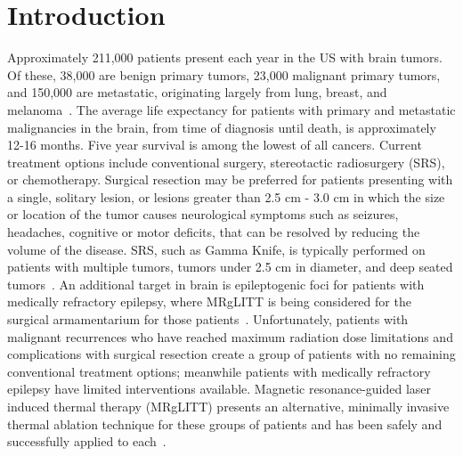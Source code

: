 \documentclass[12pt]{article}
\begin{document}
\section{Introduction}

Approximately 211,000 patients present each year in the US with brain
tumors.  Of these, 38,000 are benign primary tumors, 23,000 malignant
primary tumors, and 150,000 are metastatic, originating largely from lung,
breast, and melanoma~\cite{NCIFact13,
kalkanis2010evidence,gavrilovic2005brain,bafaloukos2004treatment,Owonikoko2014}.
The average life expectancy for patients with primary and metastatic
malignancies in the brain, from time of diagnosis until death, is
approximately 12-16 months. Five year survival is among the lowest of all
cancers. Current treatment options include conventional surgery,
stereotactic radiosurgery (SRS), or chemotherapy.  
Surgical resection may be preferred for patients presenting with a single,
solitary lesion, or lesions greater than 2.5 cm - 3.0 cm in which the size
or location of the tumor causes neurological symptoms such as seizures,
headaches, cognitive or motor deficits, that can be resolved by reducing
the volume of the disease.
SRS, such as Gamma Knife\textsuperscript{\textregistered}, is typically performed on patients with multiple
tumors, tumors under 2.5 cm in diameter, and deep seated tumors~\cite{alexander1995stereotactic}.
An additional target in brain is
epileptogenic foci for patients with medically refractory epilepsy,
where MRgLITT is being considered for the surgical armamentarium for those patients~\cite{Curry2012,Nowell2014}.
Unfortunately, patients with malignant recurrences who have reached max{\color{red}imum} radiation dose
limitations and complications with surgical resection create a group of
patients with no remaining conventional treatment options;
meanwhile patients with medically refractory epilepsy have limited interventions available.
Magnetic resonance-guided laser induced thermal therapy (MRgLITT) presents
an alternative, minimally invasive thermal ablation technique for these
groups of patients and has been safely and successfully applied to 
each~\cite{carpentieretal08,carpentier2011laser,
carpentier2012mr,torres2013stereotactic,jethwa2012magnetic,
schwarzmaier2002basic,schulze2004laser}. 
\end{document}
